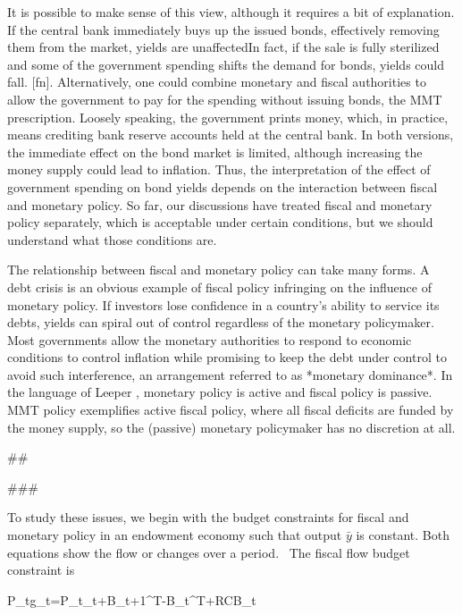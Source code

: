 ﻿\documentclass[oneside]{book}
\begin{document}
It is possible to make sense of this view, although it requires a bit of
explanation. If the central bank immediately buys up the issued bonds,
effectively removing them from the market, yields are unaffectedIn fact, if the sale is fully sterilized and some of the government spending
shifts the demand for bonds, yields could fall. [fn]. Alternatively, one could
combine monetary and fiscal authorities to allow the government to pay for
the spending without issuing bonds, the MMT prescription. Loosely speaking,
the government prints money, which, in practice, means crediting bank
reserve accounts held at the central bank. In both versions, the immediate
effect on the bond market is limited, although increasing the money supply could
lead to inflation. Thus, the interpretation of the effect of government
spending on bond yields depends on the interaction between fiscal and monetary
policy. So far, our discussions have treated fiscal and monetary policy
separately, which is acceptable under certain conditions, but we should
understand what those conditions are.

The relationship between fiscal and monetary policy can take many forms. A debt crisis is an obvious example of fiscal policy infringing on the influence of monetary policy. If investors lose confidence in a country's ability to service its debts, yields can spiral out of control regardless of the monetary policymaker.  Most governments allow the monetary authorities to respond to economic conditions to control inflation while promising to keep the debt under control to avoid such interference, an arrangement referred to as *monetary dominance*. In the language of Leeper , monetary policy is active and fiscal policy is passive. MMT policy exemplifies active fiscal policy, where all fiscal deficits are funded by the money supply, so the (passive) monetary policymaker has no discretion at all.



##




###



To study these issues, we begin with the budget constraints for fiscal and
monetary policy in an endowment economy such that output $\bar{y}$ is
constant. Both equations show the flow or changes over a period. \
The fiscal flow budget constraint is



P_{t}g_{t}=P_{t}\tau _{t}+B_{t+1}^{T}-B_{t}^{T}+RCB_{t}
\end{document}
